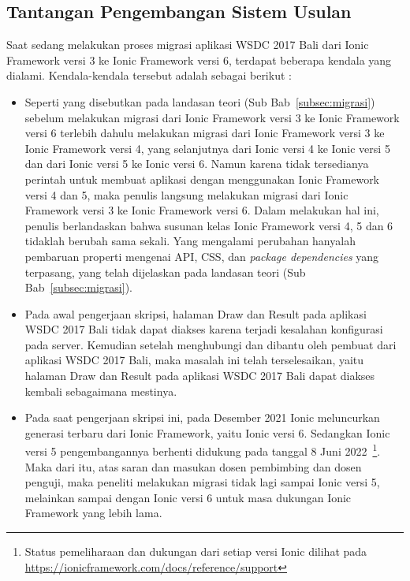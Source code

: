 \subsection{Tantangan Pengembangan Sistem Usulan}
\label{sec:analisisPermasalahanSistemKini}
Saat sedang melakukan proses migrasi aplikasi WSDC 2017 Bali dari Ionic Framework versi 3 ke Ionic Framework versi 6, terdapat beberapa kendala yang dialami. Kendala-kendala tersebut adalah sebagai berikut : 

\begin{itemize}
	\item Seperti yang disebutkan pada landasan teori (Sub Bab~\ref{subsec:migrasi}) sebelum melakukan migrasi dari Ionic Framework versi 3 ke Ionic Framework versi 6 terlebih dahulu melakukan migrasi dari Ionic Framework versi 3 ke Ionic Framework versi 4, yang selanjutnya dari Ionic versi 4 ke Ionic versi 5 dan dari Ionic versi 5 ke Ionic versi 6. Namun karena tidak tersedianya perintah untuk membuat aplikasi dengan menggunakan Ionic Framework versi 4 dan 5, maka penulis langsung melakukan migrasi dari Ionic Framework versi 3 ke Ionic Framework versi 6. Dalam melakukan hal ini, penulis berlandaskan bahwa susunan kelas Ionic Framework versi 4, 5 dan 6 tidaklah berubah sama sekali. Yang mengalami perubahan hanyalah pembaruan properti mengenai API, CSS, dan {\it package dependencies} yang terpasang, yang telah dijelaskan pada landasan teori (Sub Bab~\ref{subsec:migrasi}).
	
	\item Pada awal pengerjaan skripsi, halaman Draw dan Result pada aplikasi WSDC 2017 Bali tidak dapat diakses karena terjadi kesalahan konfigurasi pada server. Kemudian setelah menghubungi dan dibantu oleh pembuat dari aplikasi WSDC 2017 Bali, maka masalah ini telah terselesaikan, yaitu halaman Draw dan Result pada aplikasi WSDC 2017 Bali dapat diakses kembali sebagaimana mestinya.
	
	\item Pada saat pengerjaan skripsi ini, pada Desember 2021 Ionic meluncurkan generasi terbaru dari Ionic Framework, yaitu Ionic versi 6. Sedangkan Ionic versi 5 pengembangannya berhenti didukung pada tanggal 8 Juni 2022~\footnote{Status pemeliharaan dan dukungan dari setiap versi Ionic dilihat pada \url{https://ionicframework.com/docs/reference/support}}. Maka dari itu, atas saran dan masukan dosen pembimbing dan dosen penguji, maka peneliti melakukan migrasi tidak lagi sampai Ionic versi 5, melainkan sampai dengan Ionic versi 6 untuk masa dukungan Ionic Framework yang lebih lama.
	
\end{itemize}
